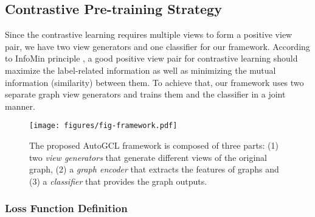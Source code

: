 \subsection{Contrastive Pre-training Strategy}

Since the contrastive learning requires multiple views to form a positive view pair, we have two view generators and one classifier for our framework. According to InfoMin principle \cite{tian2020goodview}, a good positive view pair for contrastive learning should maximize the label-related information as well as minimizing the mutual information (similarity) between them. To achieve that, our framework uses two separate graph view generators and trains them and the classifier in a joint manner. 

\begin{figure*}[t]
    \begin{center}
    \texttt{[image: figures/fig-framework.pdf]}
    \end{center}
    \vspace{-0.6cm}
    \caption{The proposed AutoGCL framework is composed of three parts: (1) two \emph{view generators} that generate different views of the original graph, (2) a \emph{graph encoder} that extracts the features of graphs and (3) a \emph{classifier} that provides the graph outputs.}
    \vspace{-0.6cm}
    \label{fig-framework}
\end{figure*}

\subsubsection{Loss Function Definition}


